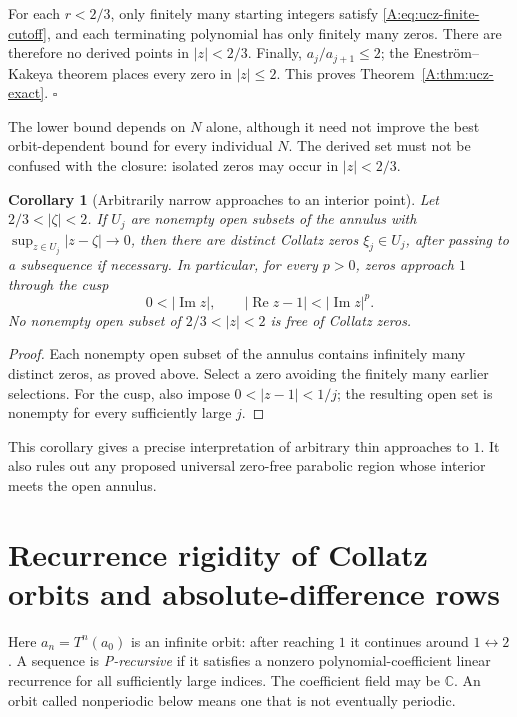 \documentclass[11pt,a4paper]{article}
\newtheorem{corollary}[theorem]{Corollary}
\theoremstyle{definition}
\theoremstyle{remark}
\numberwithin{equation}{section}
\begin{document}
For each $r<2/3$, only finitely many starting integers satisfy
\eqref{A:eq:ucz-finite-cutoff}, and each terminating polynomial has only
finitely many zeros. There are therefore no derived points in
$|z|<2/3$. Finally, $a_j/a_{j+1}\leq2$; the Enestr\"om--Kakeya theorem
places every zero in $|z|\leq2$. This proves
Theorem~\ref{A:thm:ucz-exact}. \hfill$\square$

The lower bound depends on $N$ alone, although it need not improve the
best orbit-dependent bound for every individual $N$.
The derived set must not be confused with the closure:
isolated zeros may occur in $|z|<2/3$.

\begin{corollary}[Arbitrarily narrow approaches to an interior point]
\label{A:cor:ucz-cusps}
Let $2/3<|\zeta|<2$. If $U_j$ are nonempty open subsets of the annulus
with $\sup_{z\in U_j}|z-\zeta|\to0$, then there are distinct Collatz
zeros $\xi_j\in U_j$, after passing to a subsequence if necessary.
In particular, for every $p>0$, zeros approach $1$ through the cusp
\[
 0<|\operatorname{Im}z|,\qquad
 |\operatorname{Re}z-1|<|\operatorname{Im}z|^p.
\]
No nonempty open subset of $2/3<|z|<2$ is free of Collatz zeros.
\end{corollary}
\begin{proof}
Each nonempty open subset of the annulus contains infinitely many
distinct zeros, as proved above. Select a zero avoiding the finitely
many earlier selections. For the cusp, also impose
$0<|z-1|<1/j$; the resulting open set is nonempty for every sufficiently
large $j$.
\end{proof}

This corollary gives a precise interpretation of arbitrary thin
approaches to $1$. It also rules out any proposed universal zero-free
parabolic region whose interior meets the open annulus.

\section{Recurrence rigidity of Collatz orbits and absolute-difference rows}
\label{A:sec:ucr}

Here $a_n=T^n(a_0)$ is an infinite orbit: after reaching $1$ it continues
around $1\leftrightarrow2$. A sequence is \emph{P-recursive} if it
satisfies a nonzero polynomial-coefficient linear recurrence for all
sufficiently large indices. The coefficient field may be $\mathbb C$.
An orbit called nonperiodic below means one that is not eventually
periodic.
\end{document}
